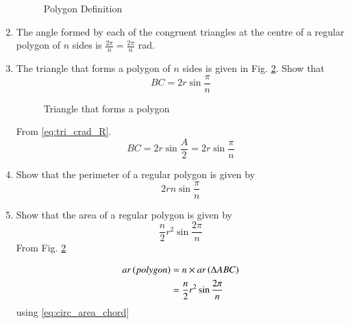 \begin{enumerate}[label=\arabic*.,ref=\thesubsection.\theenumi]
\begin{figure}[!ht]
\begin{center}
		\resizebox{\columnwidth}{!}{}
	\end{center}
	\caption{Polygon Definition}
	\label{ch5_polygon_def}	
\end{figure}
%
\item
The angle formed by each of the congruent triangles at the centre of a regular polygon of $n$ sides is $\frac{2\pi}{n} = \frac{2\pi}{n}$ rad.
%
\item 	The triangle that forms a polygon of $n$ sides is given in Fig. \ref{ch5_polygon_area}. Show that 
%
\begin{equation}
BC = 2r \sin\frac{\pi}{n}
\label{eq:circ_chord_len}
\end{equation}
%

\begin{figure}[!ht]
	\begin{center}
		
		\resizebox{\columnwidth}{!}{}
	\end{center}
	\caption{Triangle that forms a polygon}
	\label{ch5_polygon_area}	
\end{figure}
%
\solution From  \eqref{eq:tri_crad_R}.
%
\begin{equation}
BC = 2r \sin \frac{A}{2} = 2r\sin\frac{\pi}{n}
\end{equation}
\item
Show that the perimeter of a regular polygon is given by 
%
\begin{equation}
\label{eq:peri_poly_n}
2rn \sin\frac{\pi}{n}
\end{equation}
%
\item
Show that the area of a regular polygon is given by 
%
\begin{equation}
\frac{n}{2}r^{2}\sin\frac{2\pi}{n}
\end{equation}
%
\solution  From Fig. 	\ref{ch5_polygon_area}	

%
\begin{equation}
\begin{split}
ar\left(polygon\right) &= n \times ar\left(\Delta ABC\right) \\
&= \frac{n}{2}r^{2}\sin\frac{2\pi}{n}
\end{split}
\end{equation}
%
using \eqref{eq:circ_area_chord}


\end{enumerate}
